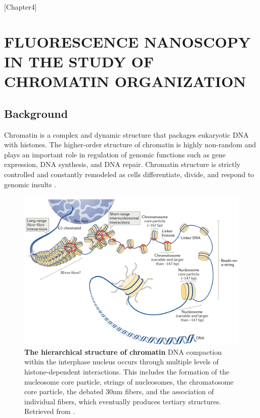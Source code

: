 [Chapter4]

\chapter{FLUORESCENCE NANOSCOPY IN THE STUDY OF CHROMATIN ORGANIZATION}

\section{Background}

Chromatin is a complex and dynamic structure that packages eukaryotic DNA with histones. The higher-order structure of chromatin is highly non-random and plays an important role in regulation of genomic functions such as gene expression, DNA synthesis, and DNA repair. Chromatin structure is strictly controlled and constantly remodeled as cells differentiate, divide, and respond to genomic insults \parencite{Auerbach2009,Chien2009,Clapier2009,Misteli2007,Vidi2014}.

\begin{figure}[t]
\centering
\includegraphics[width=13cm]{media/Chromatin.png}
\caption{\textbf{The hierarchical structure of chromatin} DNA compaction within the interphase nucleus occurs through multiple levels of histone-dependent interactions. This includes the formation of the nucleosome core particle, strings of nucleosomes, the chromatosome core particle, the debated 30nm fibers, and the association of individual fibers, which eventually produces tertiary structures. Retrieved from \parencite{Fyodorov2018}.}
\label{fig:fig16}
\end{figure}

